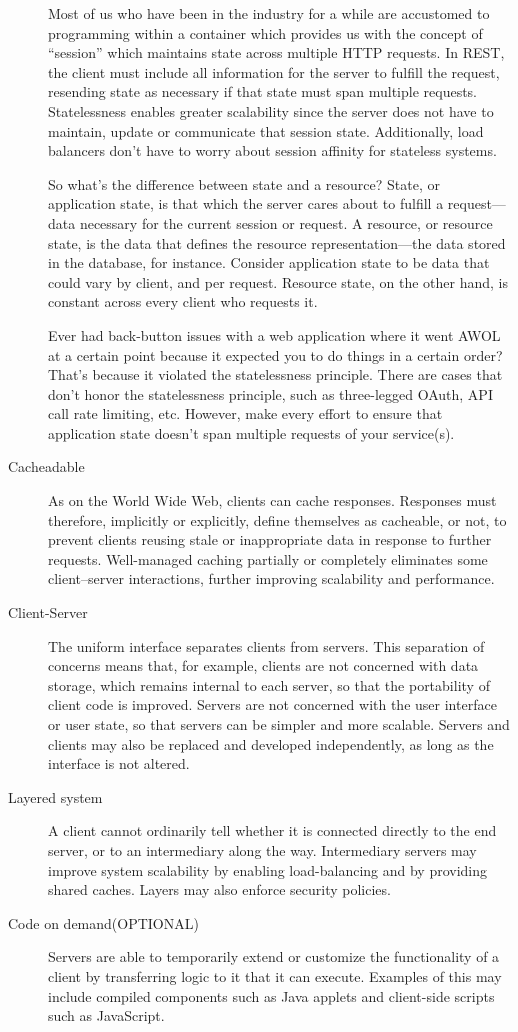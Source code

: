 \begin{description}
Most of us who have been in the industry for a while are accustomed to programming within a container which provides us with the concept of “session” which maintains state across multiple HTTP requests. In REST, the client must include all information for the server to fulfill the request, resending state as necessary if that state must span multiple requests. Statelessness enables greater scalability since the server does not have to maintain, update or communicate that session state. Additionally, load balancers don't have to worry about session affinity for stateless systems.

So what's the difference between state and a resource? State, or application state, is that which the server cares about to fulfill a request—data necessary for the current session or request. A resource, or resource state, is the data that defines the resource representation—the data stored in the database, for instance. Consider application state to be data that could vary by client, and per request. Resource state, on the other hand, is constant across every client who requests it.

Ever had back-button issues with a web application where it went AWOL at a certain point because it expected you to do things in a certain order? That's because it violated the statelessness principle. There are cases that don't honor the statelessness principle, such as three-legged OAuth, API call rate limiting, etc. However, make every effort to ensure that application state doesn't span multiple requests of your service(s).
\item[Cacheadable]
As on the World Wide Web, clients can cache responses. Responses must therefore, implicitly or explicitly, define themselves as cacheable, or not, to prevent clients reusing stale or inappropriate data in response to further requests. Well-managed caching partially or completely eliminates some client–server interactions, further improving scalability and performance.
\item[Client-Server]  
The uniform interface separates clients from servers. This separation of concerns means that, for example, clients are not concerned with data storage, which remains internal to each server, so that the portability of client code is improved. Servers are not concerned with the user interface or user state, so that servers can be simpler and more scalable. Servers and clients may also be replaced and developed independently, as long as the interface is not altered.
\item[Layered system]
A client cannot ordinarily tell whether it is connected directly to the end server, or to an intermediary along the way. Intermediary servers may improve system scalability by enabling load-balancing and by providing shared caches. Layers may also enforce security policies.
\item[Code on demand(OPTIONAL)]
Servers are able to temporarily extend or customize the functionality of a client by transferring logic to it that it can execute. Examples of this may include compiled components such as Java applets and client-side scripts such as JavaScript.


\end{description}

